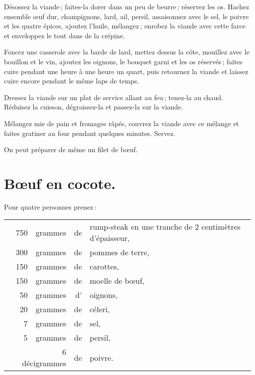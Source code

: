 Désossez la viande ; faites-la dorer dans un peu de beurre ; réservez les os.
Hachez ensemble œuf dur, champignons, lard, ail, persil, assaisonnez avec le
sel, le poivre et les quatre épices, ajoutez l'huile, mélangez ; enrobez la
viande avec cette farce et enveloppez le tout dans de la crépine.

Foncez une casserole avec la barde de lard, mettez dessus la côte, mouillez
avec le bouillon et le vin, ajoutez les oignons, le bouquet garni et les os
réservés ; faites cuire pendant une heure à une heure un quart, puis retournez
la viande et laissez cuire encore pendant le même laps de temps.

Dressez la viande sur un plat de service allant au feu ; tenez-la au chaud.
Réduisez la cuisson, dégraissez-la et passez-la sur la viande.

Mélangez mie de pain et fromages râpés, couvrez la viande avec ce mélange et
faites gratiner au four pendant quelques minutes. Servez.

\sk

On peut préparer de même un filet de bœuf.

\section*{\centering Bœuf en cocote.}
{}

Pour quatre personnes prenez :

\medskip

\footnotesize
\begin{longtable}{rrrrp{16em}}
  & 750 & grammes & de & rump-steak en une tranche de 2 centimètres d'épaisseur,                          \\
  & 300 & grammes & de & pommes de terre,                                                                 \\
  & 150 & grammes & de & carottes,                                                                        \\
  & 150 & grammes & de & moelle de bœuf,                                                                  \\
  &  50 & grammes & d' & oignons,                                                                         \\
  &  20 & grammes & de & céleri,                                                                          \\
  &   7 & grammes & de & sel,                                                                             \\
  &   5 & grammes & de & persil,                                                                          \\
  & \multicolumn{2}{r}{6 décigrammes} & de & poivre.                                                       \\
\end{longtable}
\normalsize

